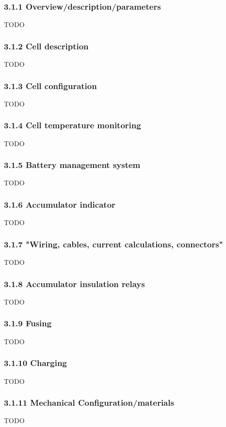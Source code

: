 \documentclass{article}
\begin{document}
\subsubsection*{3.1.1 Overview/description/parameters}
TODO

\subsubsection*{3.1.2 Cell description}
TODO

\subsubsection*{3.1.3 Cell configuration}
TODO

\subsubsection*{3.1.4 Cell temperature monitoring}
TODO

\subsubsection*{3.1.5 Battery management system}
TODO

\subsubsection*{3.1.6 Accumulator indicator}
TODO

\subsubsection*{3.1.7 "Wiring, cables, current calculations, connectors"}
TODO

\subsubsection*{3.1.8 Accumulator insulation relays}
TODO

\subsubsection*{3.1.9 Fusing}
TODO

\subsubsection*{3.1.10 Charging}
TODO

\subsubsection*{3.1.11 Mechanical Configuration/materials}
TODO
\end{document}
